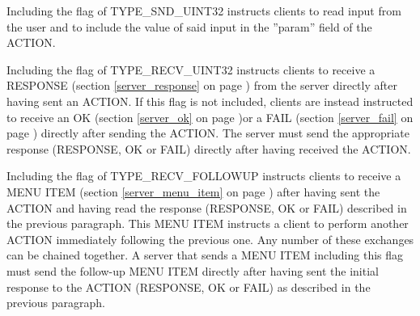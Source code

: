 \documentclass[a4paper,11pt]{article}
\begin{document}
\begin{minipage}{\dimexpr\textwidth-1.4cm}
\vspace{0.3cm}

Including the flag of TYPE\_SND\_UINT32 instructs clients to read
input from the user and to include the value of said input in the
''param'' field of the ACTION.

\vspace{0.3cm}

Including the flag of TYPE\_RECV\_UINT32 instructs clients to receive
a RESPONSE (section \ref{server_response} on page \pageref{server_response})
from the server directly after having sent an ACTION. If this flag is
not included, clients are instead instructed to receive an OK
(section \ref{server_ok} on page \pageref{server_ok})or a FAIL
(section \ref{server_fail} on page \pageref{server_fail}) directly
after sending the ACTION. The server must send the appropriate
response (RESPONSE, OK or FAIL) directly after having received
the ACTION.

\end{minipage}

\hfill\begin{minipage}{\dimexpr\textwidth-1.4cm}

Including the flag of TYPE\_RECV\_FOLLOWUP instructs clients to
receive a MENU ITEM (section \ref{server_menu_item} on page \pageref{server_menu_item})
after having sent the ACTION and having read the response (RESPONSE,
OK or FAIL) described in the previous paragraph. This MENU ITEM instructs
a client to perform another ACTION immediately following the previous
one. Any number of these exchanges can be chained together. A server
that sends a MENU ITEM including this flag must send the follow-up
MENU ITEM directly after having sent the initial response to the
ACTION (RESPONSE, OK or FAIL) as described in the previous paragraph.


\end{minipage}
\end{document}
